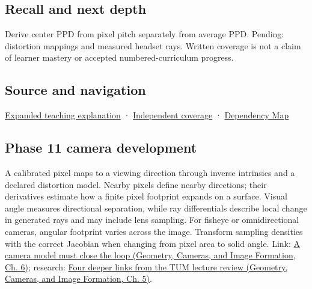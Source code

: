 \subsection{Recall and next depth}\label{appendix-7d356c396d1a-recall-and-next-depth}

Derive center PPD from pixel pitch separately from average PPD. Pending: distortion mappings and measured headset rays. Written coverage is not a claim of learner mastery or accepted numbered-curriculum progress.

\subsection{Source and navigation}\label{appendix-7d356c396d1a-source-and-navigation}

\hyperref[04-visual-computing-ii-ch042-angles-connect-display-samples-to-a-viewer]{Expanded teaching explanation} · \hyperref[appendix-fd090d982a15-xr01---independent-seeing-and-representation-source]{Independent coverage} · \hyperref[appendix-4ad47bdd269a]{Dependency Map}

\subsection{Phase 11 camera development}\label{appendix-7d356c396d1a-phase-11-camera-development}

A calibrated pixel maps to a viewing direction through inverse intrinsics and a declared distortion model. Nearby pixels define nearby directions; their derivatives estimate how a finite pixel footprint expands on a surface. Visual angle measures directional separation, while ray differentials describe local change in generated rays and may include lens sampling. For fisheye or omnidirectional cameras, angular footprint varies across the image. Transform sampling densities with the correct Jacobian when changing from pixel area to solid angle. Link: \href{../03-Geometry-Cameras-and-Image-Formation/main.pdf\#nameddest=02-foundations-ii-ch037-a-camera-model-must-close-the-loop}{A camera model must close the loop (Geometry, Cameras, and Image Formation, Ch. 6)}; research: \href{../03-Geometry-Cameras-and-Image-Formation/main.pdf\#nameddest=02-foundations-ii-ch036-four-deeper-links-from-the-tum-lecture-review}{Four deeper links from the TUM lecture review (Geometry, Cameras, and Image Formation, Ch. 5)}.
